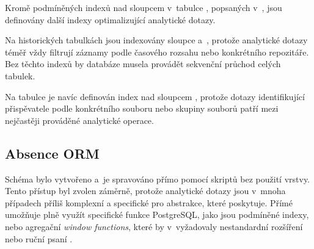 Kromě podmíněných indexů nad sloupcem  v~tabulce , popsaných v~, jsou definovány další indexy optimalizující analytické dotazy.

Na historických tabulkách jsou indexovány sloupce  a~, protože analytické dotazy téměř vždy filtrují záznamy podle časového rozsahu nebo konkrétního repozitáře. Bez těchto indexů by databáze musela provádět sekvenční průchod celých tabulek.

Na tabulce  je navíc definován index nad sloupcem , protože dotazy identifikující přispěvatele podle konkrétního souboru nebo skupiny souborů patří mezi nejčastěji prováděné analytické operace.

\subsection{Absence ORM}
\label{subsec:implementation:db_scheme:no_orm}

Schéma bylo vytvořeno a~je spravováno přímo pomocí \SQL skriptů bez použití \ORM vrstvy. Tento přístup byl zvolen záměrně, protože analytické dotazy jsou v~mnoha případech příliš komplexní a specifické pro abstrakce, které \ORM poskytuje. Přímé \SQL umožňuje plně využít specifické funkce PostgreSQL, jako jsou podmíněné indexy,  nebo agregační \emph{window functions}, které by v~\ORM vyžadovaly nestandardní rozšíření nebo ruční psaní  \SQL.
